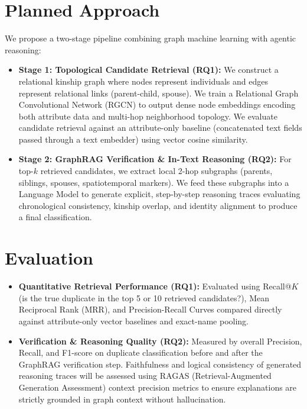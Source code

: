 \documentclass[11pt, a4paper]{article}
\begin{document}
\section{Planned Approach}
We propose a two-stage pipeline combining graph machine learning with agentic reasoning:
\begin{itemize}
    \item \textbf{Stage 1: Topological Candidate Retrieval (RQ1):} We construct a relational kinship graph where nodes represent individuals and edges represent relational links (parent-child, spouse). We train a Relational Graph Convolutional Network (RGCN) to output dense node embeddings encoding both attribute data and multi-hop neighborhood topology. We evaluate candidate retrieval against an attribute-only baseline (concatenated text fields passed through a text embedder) using vector cosine similarity.
    \item \textbf{Stage 2: GraphRAG Verification \& In-Text Reasoning (RQ2):} For top-$k$ retrieved candidates, we extract local 2-hop subgraphs (parents, siblings, spouses, spatiotemporal markers). We feed these subgraphs into a Language Model to generate explicit, step-by-step reasoning traces evaluating chronological consistency, kinship overlap, and identity alignment to produce a final classification.
\end{itemize}

\section{Evaluation}
\begin{itemize}
    \item \textbf{Quantitative Retrieval Performance (RQ1):} Evaluated using Recall@$K$ (is the true duplicate in the top 5 or 10 retrieved candidates?), Mean Reciprocal Rank (MRR), and Precision-Recall Curves compared directly against attribute-only vector baselines and exact-name pooling.
    \item \textbf{Verification \& Reasoning Quality (RQ2):} Measured by overall Precision, Recall, and F1-score on duplicate classification before and after the GraphRAG verification step. Faithfulness and logical consistency of generated reasoning traces will be assessed using RAGAS (Retrieval-Augmented Generation Assessment) context precision metrics to ensure explanations are strictly grounded in graph context without hallucination.
\end{itemize}
\end{document}
